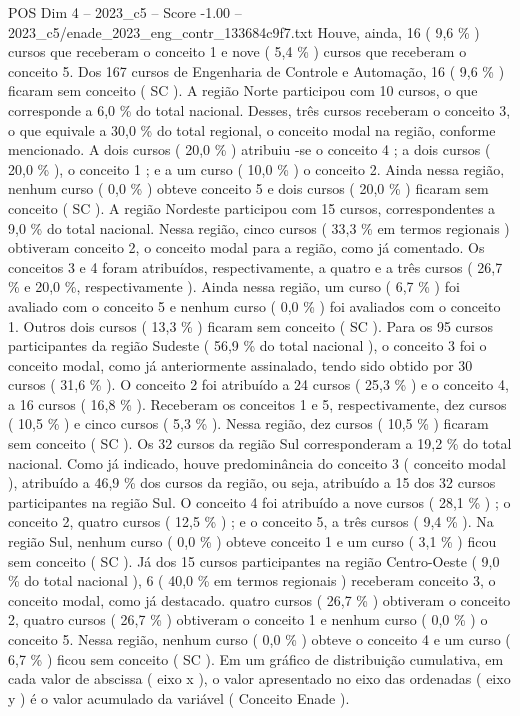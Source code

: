 \begin{textsample}{POS Dim 4 – 2023\_c5 – Score -1.00 – 2023\_c5/enade\_2023\_eng\_contr\_133684c9f7.txt}
Houve, ainda, 16 ( 9,6 \% ) cursos que receberam o conceito 1 e nove ( 5,4 \% ) cursos que receberam o conceito 5.
Dos 167 cursos de Engenharia de Controle e Automação, 16 ( 9,6 \% ) ficaram sem conceito ( SC ).
A região Norte participou com 10 cursos, o que corresponde a 6,0 \% do total nacional.
Desses, três cursos receberam o conceito 3, o que equivale a 30,0 \% do total regional, o conceito modal na região, conforme mencionado.
A dois cursos ( 20,0 \% ) atribuiu -se o conceito 4 ; a dois cursos ( 20,0 \% ), o conceito 1 ; e a um curso ( 10,0 \% ) o conceito 2.
Ainda nessa região, nenhum curso ( 0,0 \% ) obteve conceito 5 e dois cursos ( 20,0 \% ) ficaram sem conceito ( SC ).
A região Nordeste participou com 15 cursos, correspondentes a 9,0 \% do total nacional.
Nessa região, cinco cursos ( 33,3 \% em termos regionais ) obtiveram conceito 2, o conceito modal para a região, como já comentado.
Os conceitos 3 e 4 foram atribuídos, respectivamente, a quatro e a três cursos ( 26,7 \% e 20,0 \%, respectivamente ).
Ainda nessa região, um curso ( 6,7 \% ) foi avaliado com o conceito 5 e nenhum curso ( 0,0 \% ) foi avaliados com o conceito 1.
Outros dois cursos ( 13,3 \% ) ficaram sem conceito ( SC ).
Para os 95 cursos participantes da região Sudeste ( 56,9 \% do total nacional ), o conceito 3 foi o conceito modal, como já anteriormente assinalado, tendo sido obtido por 30 cursos ( 31,6 \% ).
O conceito 2 foi atribuído a 24 cursos ( 25,3 \% ) e o conceito 4, a 16 cursos ( 16,8 \% ).
Receberam os conceitos 1 e 5, respectivamente, dez cursos ( 10,5 \% ) e cinco cursos ( 5,3 \% ).
Nessa região, dez cursos ( 10,5 \% ) ficaram sem conceito ( SC ).
Os 32 cursos da região Sul corresponderam a 19,2 \% do total nacional.
Como já indicado, houve predominância do conceito 3 ( conceito modal ), atribuído a 46,9 \% dos cursos da região, ou seja, atribuído a 15 dos 32 cursos participantes na região Sul.
O conceito 4 foi atribuído a nove cursos ( 28,1 \% ) ; o conceito 2, quatro cursos ( 12,5 \% ) ; e o conceito 5, a três cursos ( 9,4 \% ).
Na região Sul, nenhum curso ( 0,0 \% ) obteve conceito 1 e um curso ( 3,1 \% ) ficou sem conceito ( SC ).
Já dos 15 cursos participantes na região Centro-Oeste ( 9,0 \% do total nacional ), 6 ( 40,0 \% em termos regionais ) receberam conceito 3, o conceito modal, como já destacado. quatro cursos ( 26,7 \% ) obtiveram o conceito 2, quatro cursos ( 26,7 \% ) obtiveram o conceito 1 e nenhum curso ( 0,0 \% ) o conceito 5.
Nessa região, nenhum curso ( 0,0 \% ) obteve o conceito 4 e um curso ( 6,7 \% ) ficou sem conceito ( SC ).
Em um gráfico de distribuição cumulativa, em cada valor de abscissa ( eixo x ), o valor apresentado no eixo das ordenadas ( eixo y ) é o valor acumulado da variável ( Conceito Enade ).

\end{textsample}
